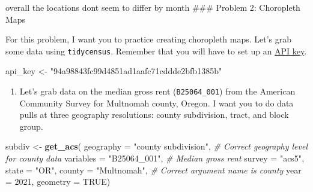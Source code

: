 \documentclass[
]{article}
\newenvironment{Shaded}{\begin{snugshade}}{\end{snugshade}}
\newcommand{\AttributeTok}[1]{\textcolor[rgb]{0.13,0.29,0.53}{#1}}
\newcommand{\CommentTok}[1]{\textcolor[rgb]{0.56,0.35,0.01}{\textit{#1}}}
\newcommand{\ConstantTok}[1]{\textcolor[rgb]{0.56,0.35,0.01}{#1}}
\newcommand{\DecValTok}[1]{\textcolor[rgb]{0.00,0.00,0.81}{#1}}
\newcommand{\FunctionTok}[1]{\textcolor[rgb]{0.13,0.29,0.53}{\textbf{#1}}}
\newcommand{\NormalTok}[1]{#1}
\newcommand{\OtherTok}[1]{\textcolor[rgb]{0.56,0.35,0.01}{#1}}
\newcommand{\StringTok}[1]{\textcolor[rgb]{0.31,0.60,0.02}{#1}}
\providecommand{\tightlist}{%
  \setlength{\itemsep}{0pt}\setlength{\parskip}{0pt}}
\begin{document}
overall the locations dont seem to differ by month \#\#\# Problem 2:
Choropleth Maps

For this problem, I want you to practice creating choropleth maps. Let's
grab some data using \texttt{tidycensus}. Remember that you will have to
set up an \href{https://api.census.gov/data/key_signup.html}{API key}.

\begin{Shaded}
\begin{Highlighting}[]
\NormalTok{api\_key }\OtherTok{\textless{}{-}}  \StringTok{"94a98843fc99d4851ad1aafc71cddde2bfb1385b"}
\end{Highlighting}
\end{Shaded}

\begin{enumerate}
\def\labelenumi{\alph{enumi}.}
\tightlist
\item
  Let's grab data on the median gross rent (\texttt{B25064\_001}) from
  the American Community Survey for Multnomah county, Oregon. I want you
  to do data pulls at three geography resolutions: county subdivision,
  tract, and block group.
\end{enumerate}

\begin{Shaded}
\begin{Highlighting}[]
\NormalTok{subdiv }\OtherTok{\textless{}{-}} \FunctionTok{get\_acs}\NormalTok{(}
  \AttributeTok{geography =} \StringTok{"county subdivision"}\NormalTok{, }\CommentTok{\# Correct geography level for county data}
  \AttributeTok{variables =} \StringTok{"B25064\_001"}\NormalTok{, }\CommentTok{\# Median gross rent}
  \AttributeTok{survey =} \StringTok{"acs5"}\NormalTok{, }
  \AttributeTok{state =} \StringTok{"OR"}\NormalTok{,}
  \AttributeTok{county =} \StringTok{"Multnomah"}\NormalTok{, }\CommentTok{\# Correct argument name is \textquotesingle{}county\textquotesingle{}}
  \AttributeTok{year =} \DecValTok{2021}\NormalTok{,}
  \AttributeTok{geometry =} \ConstantTok{TRUE}\NormalTok{)}
\end{Highlighting}
\end{Shaded}
\end{document}
